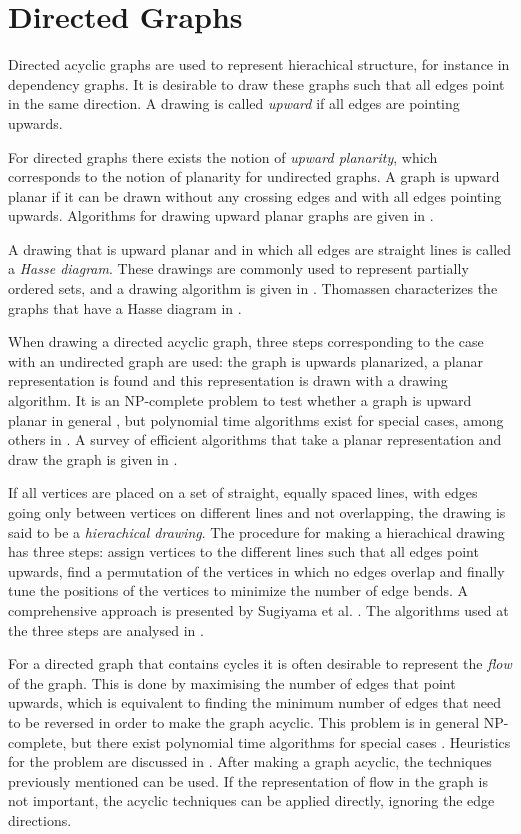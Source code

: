 \section{Directed Graphs}

Directed acyclic graphs are used to represent hierachical structure, for
instance in dependency graphs. It is desirable to draw these graphs such that
all edges point in the same direction. A drawing is called \emph{upward} if
all edges are pointing upwards. 

For directed graphs there exists the notion of \emph{upward planarity}, which
corresponds to the notion of planarity for undirected graphs. A graph is
upward planar if it can be drawn without any crossing edges and with all edges
pointing upwards. Algorithms for drawing upward planar graphs are given in
\cite{DiBattista1988}. 

A drawing that is upward planar and in which all edges are straight lines is
called a \emph{Hasse diagram}. These drawings are commonly used to represent
partially ordered sets, and a drawing algorithm is given in
\cite{Jurgensen1983}. Thomassen characterizes the graphs that have a Hasse
diagram in \cite{Thomassen1989}. 

When drawing a directed acyclic graph, three steps corresponding to the case
with an undirected graph are used: the graph is upwards planarized, a planar
representation is found and this representation is drawn with a drawing
algorithm. It is an NP-complete problem to test whether a graph is upward
planar in general \cite{Garg1994}, but polynomial time algorithms exist for
special cases, among others in \cite{DiBattista1990}. A survey of efficient
algorithms that take a planar representation and draw the graph is given in
\cite{Tamassia1990}.

If all vertices are placed on a set of straight, equally spaced lines, with
edges going only between vertices on different lines and not overlapping, the
drawing is said to be a \emph{hierachical drawing}. The procedure for making a
hierachical drawing has three steps: assign vertices to the different lines
such that all edges point upwards, find a permutation of the vertices in which
no edges overlap and finally tune the positions of the vertices to minimize
the number of edge bends. A comprehensive approach is presented by Sugiyama
et al. \cite{Sugiyama1981}. The algorithms used at the three steps are
analysed in \cite{Lin1992}.

For a directed graph that contains cycles it is often desirable to represent
the \emph{flow} of the graph. This is done by maximising the number of edges
that point upwards, which is equivalent to finding the minimum number of edges
that need to be reversed in order to make the graph acyclic. This problem is
in general NP-complete, but there exist polynomial time algorithms for special
cases \cite{Frank1981}. Heuristics for the problem are discussed in
\cite{Berger1990}. After making a graph acyclic, the techniques previously
mentioned can be used. If the representation of flow in the graph is not
important, the acyclic techniques can be applied directly, ignoring the edge
directions.

